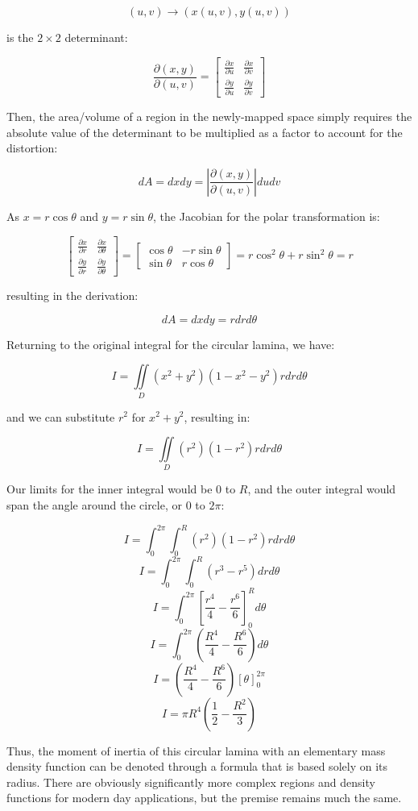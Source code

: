 \[(u, v) \rightarrow (x(u, v), y(u, v))\]

is the $2 \times 2$ determinant:

\[\frac{\partial(x,y)}{\partial(u,v)} = \begin{bmatrix} \frac{\partial x}{\partial u} & \frac{\partial x}{\partial v} \\ \frac{\partial y}{\partial u} & \frac{\partial y}{\partial v} \end{bmatrix}\]

Then, the area/volume of a region in the newly-mapped space simply requires the absolute value of the determinant to be multiplied as a factor to account for the distortion:

\[dA = dxdy = \left|\frac{\partial(x,y)}{\partial(u,v)}\right|dudv\]

As $x = r\cos \theta$ and $y = r\sin \theta$, the Jacobian for the polar transformation is:

\[ \begin{bmatrix} \frac{\partial x}{\partial r} & \frac{\partial x}{\partial \theta} \\ \frac{\partial y}{\partial r} & \frac{\partial y}{\partial \theta} \end{bmatrix} = \begin{bmatrix} \cos \theta & -r \sin \theta \\ \sin \theta & r \cos \theta \end{bmatrix} = r \cos^2{\theta} + r \sin^2{\theta} = r\]

resulting in the derivation:

\[dA = dxdy = rdrd\theta\]

Returning to the original integral for the circular lamina, we have:

\[I = \iint\limits_{D} (x^2+y^2)(1 - x^2 - y^2) rdrd\theta\]

and we can substitute $r^2$ for $x^2+y^2$, resulting in:

\[I = \iint\limits_{D} (r^2)(1 - r^2) rdrd\theta\]

Our limits for the inner integral would be $0$ to $R$, and the outer integral would span the angle around the circle, or $0$ to $2\pi$:

\[I = \int_0^{2\pi} \int_0^R (r^2)(1 - r^2) rdrd\theta\]
\[I = \int_0^{2\pi} \int_0^R (r^3 - r^5) drd\theta\]
\[I = \int_0^{2\pi} \left[\frac{r^4}{4} - \frac{r^6}{6}\right]_0^R d\theta\]
\[I = \int_0^{2\pi} \left(\frac{R^4}{4} - \frac{R^6}{6}\right) d\theta\]
\[I = \left(\frac{R^4}{4} - \frac{R^6}{6}\right)\left[\theta \right]_0^{2\pi}\]
\[I = \pi R^4\left(\frac{1}{2} - \frac{R^2}{3}\right)\]

Thus, the moment of inertia of this circular lamina with an elementary mass density function can be denoted through a formula that is based solely on its radius. There are obviously significantly more complex regions and density functions for modern day applications, but the premise remains much the same.
